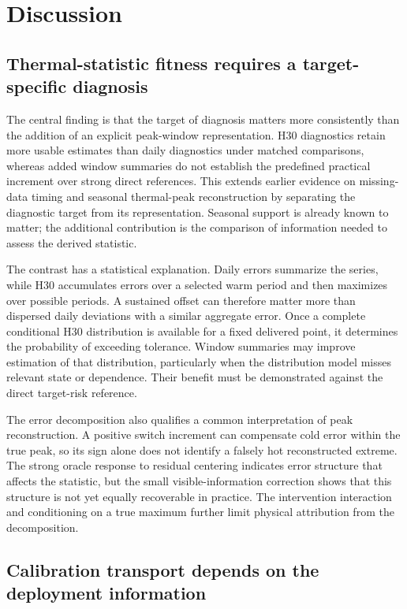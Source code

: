 \section{Discussion}

\subsection{Thermal-statistic fitness requires a target-specific diagnosis}

The central finding is that the target of diagnosis matters more consistently than the addition of an explicit peak-window representation. H30 diagnostics retain more usable estimates than daily diagnostics under matched comparisons, whereas added window summaries do not establish the predefined practical increment over strong direct references. This extends earlier evidence on missing-data timing and seasonal thermal-peak reconstruction \cite{johnson2021,beaufort2022} by separating the diagnostic target from its representation. Seasonal support is already known to matter; the additional contribution is the comparison of information needed to assess the derived statistic.

The contrast has a statistical explanation. Daily errors summarize the series, while H30 accumulates errors over a selected warm period and then maximizes over possible periods. A sustained offset can therefore matter more than dispersed daily deviations with a similar aggregate error. Once a complete conditional H30 distribution is available for a fixed delivered point, it determines the probability of exceeding tolerance. Window summaries may improve estimation of that distribution, particularly when the distribution model misses relevant state or dependence. Their benefit must be demonstrated against the direct target-risk reference.

The error decomposition also qualifies a common interpretation of peak reconstruction. A positive switch increment can compensate cold error within the true peak, so its sign alone does not identify a falsely hot reconstructed extreme. The strong oracle response to residual centering indicates error structure that affects the statistic, but the small visible-information correction shows that this structure is not yet equally recoverable in practice. The intervention interaction and conditioning on a true maximum further limit physical attribution from the decomposition.

\subsection{Calibration transport depends on the deployment information}


